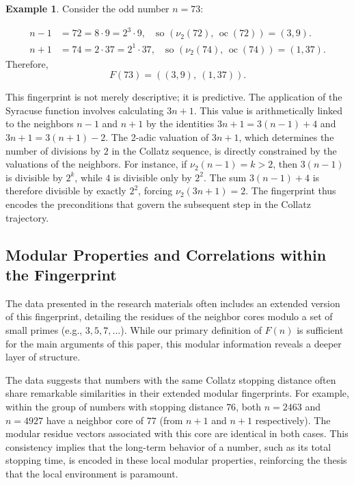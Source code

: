 \documentclass[12pt]{article}
\theoremstyle{plain}
\theoremstyle{definition}
\newtheorem{example}[theorem]{Example}
\begin{document}
\begin{example}
Consider the odd number $n = 73$:

\begin{align*}
n-1 &= 72 = 8 \cdot 9 = 2^3 \cdot 9, \quad \text{so } (\nu_2(72),\, \operatorname{oc}(72)) = (3, 9). \\
n+1 &= 74 = 2 \cdot 37 = 2^1 \cdot 37, \quad \text{so } (\nu_2(74),\, \operatorname{oc}(74)) = (1, 37).
\end{align*}
Therefore,
\[
F(73) = ((3, 9),\ (1, 37)).
\]
\end{example}

This fingerprint is not merely descriptive; it is predictive. The application of the Syracuse function involves calculating $3n + 1$. This value is arithmetically linked to the neighbors $n-1$ and $n+1$ by the identities $3n+1 = 3(n-1) + 4$ and $3n+1 = 3(n+1) - 2$. The 2-adic valuation of $3n + 1$, which determines the number of divisions by $2$ in the Collatz sequence, is directly constrained by the valuations of the neighbors. For instance, if $\nu_2(n-1) = k > 2$, then $3(n-1)$ is divisible by $2^k$, while $4$ is divisible only by $2^2$. The sum $3(n-1) + 4$ is therefore divisible by exactly $2^2$, forcing $\nu_2(3n+1) = 2$. The fingerprint thus encodes the preconditions that govern the subsequent step in the Collatz trajectory.

\subsection{Modular Properties and Correlations within the Fingerprint}

The data presented in the research materials often includes an extended version of this fingerprint, detailing the residues of the neighbor cores modulo a set of small primes (e.g., $3, 5, 7, \ldots$). While our primary definition of $F(n)$ is sufficient for the main arguments of this paper, this modular information reveals a deeper layer of structure.

The data suggests that numbers with the same Collatz stopping distance often share remarkable similarities in their extended modular fingerprints. For example, within the group of numbers with stopping distance $76$, both $n=2463$ and $n=4927$ have a neighbor core of $77$ (from $n+1$ and $n+1$ respectively). The modular residue vectors associated with this core are identical in both cases. This consistency implies that the long-term behavior of a number, such as its total stopping time, is encoded in these local modular properties, reinforcing the thesis that the local environment is paramount.
\end{document}
